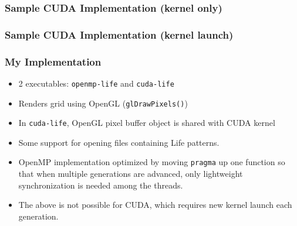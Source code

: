 \documentclass{beamer}
\begin{document}
\begin{frame}[fragile]
	\frametitle{Sample CUDA Implementation (kernel only)}
	
\end{frame}

\begin{frame}[fragile]
	\frametitle{Sample CUDA Implementation (kernel launch)}
	
\end{frame}

\begin{frame}
	\frametitle{My Implementation}
	\begin{itemize}
		\item 2 executables: {\tt openmp-life} and {\tt cuda-life}
		\item Renders grid using OpenGL ({\tt glDrawPixels()})
		\item In {\tt cuda-life}, OpenGL pixel buffer object is shared with
		CUDA kernel
		\item Some support for opening files containing Life patterns.
		\item OpenMP implementation optimized by moving {\tt pragma} up one
		function so that when multiple generations are advanced, only
		lightweight synchronization is needed among the threads.
		\item The above is not possible for CUDA, which requires new kernel
		launch each generation.
	\end{itemize}
\end{frame}
\end{document}
